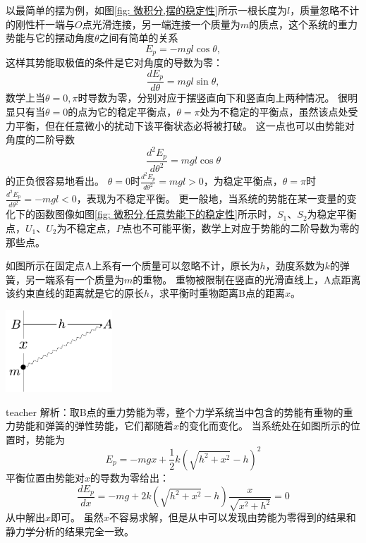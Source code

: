 以最简单的摆为例，如图\ref{fig: 微积分,摆的稳定性}所示一根长度为$l$，质量忽略不计的刚性杆一端与$O$点光滑连接，另一端连接一个质量为$m$的质点，这个系统的重力势能与它的摆动角度$\theta$之间有简单的关系
\begin{equation}
E_p = -mgl\cos\theta,
\end{equation}
这样其势能取极值的条件是它对角度的导数为零：
\begin{equation}
\frac{dE_p}{d\theta}=mgl\sin\theta,
\end{equation}
数学上当$\theta =0,\pi$时导数为零，分别对应于摆竖直向下和竖直向上两种情况。
很明显只有当$\theta=0$的点为它的稳定平衡点，$\theta=\pi$处为不稳定的平衡点，虽然该点处受力平衡，但在任意微小的扰动下该平衡状态必将被打破。
这一点也可以由势能对角度的二阶导数
\begin{equation}
\frac{d^2E_p}{d\theta^2} = mgl\cos\theta
\end{equation}
的正负很容易地看出。
$\theta=0$时$\frac{d^2E_p}{d\theta^2} = mgl>0$，为稳定平衡点，$\theta=\pi$时$\frac{d^2E_p}{d\theta^2} =- mgl<0$，表现为不稳定平衡。
更一般地，当系统的势能在某一变量的变化下的函数图像如图\ref{fig: 微积分,任意势能下的稳定性}所示时，$S_1$、$S_2$为稳定平衡点，$U_1$、$U_2$为不稳定点，$P$点也不可能平衡，数学上对应于势能的二阶导数为零的那些点。

\begin{example}
如图所示在固定点A上系有一个质量可以忽略不计，原长为$h$，劲度系数为$k$的弹簧，另一端系有一个质量为$m$的重物。
重物被限制在竖直的光滑直线上，A点距离该约束直线的距离就是它的原长$h$，求平衡时重物距离B点的距离$x$。
\begin{flushright}
\includegraphics[width=0.3\textwidth]{images/cal-8.pdf} 
\end{flushright}
\begin{taggedblock}{teacher}
\noindent
解析：取B点的重力势能为零，整个力学系统当中包含的势能有重物的重力势能和弹簧的弹性势能，它们都随着$x$的变化而变化。
当系统处在如图所示的位置时，势能为
\[E_p = -mgx+\frac{1}{2}k(\sqrt{h^2+x^2}-h)^2\]
平衡位置由势能对$x$的导数为零给出：
\[\frac{dE_p}{dx}=-mg+2k(\sqrt{h^2+x^2}-h)\frac{x}{\sqrt{x^2+h^2}}=0\]
从中解出$x$即可。
虽然$x$不容易求解，但是从中可以发现由势能为零得到的结果和静力学分析的结果完全一致。
\end{taggedblock}
\end{example}


